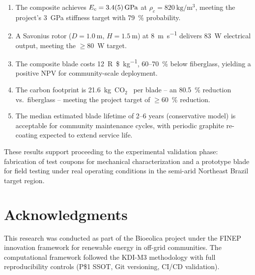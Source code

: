 \documentclass[twocolumn]{article}
\newcommand{\BrazilianReal}{R\$}
\newcommand{\COtwo}{\ensuremath{\mathrm{CO_2}}\xspace}
\newcommand{\COtwoe}{\COtwo\mathrm{e}\xspace}
\begin{document}
\begin{enumerate}
    \item The composite achieves $E_c = \SI{3.4 \pm 0.5}{\giga\pascal}$ at $\rho_c = \SI{820}{\kilogram\per\cubic\meter}$, meeting the project's \SI{3}{\giga\pascal} stiffness target with 79~\% probability.
    \item A Savonius rotor ($D = \SI{1.0}{\meter}$, $H = \SI{1.5}{\meter}$) at \SI{8}{\meter\per\second} delivers \SI{83}{\watt} electrical output, meeting the $\ge$\SI{80}{\watt} target.
    \item The composite blade costs \SI{12}{\BrazilianReal\per\kilogram}, 60--70~\% below fiberglass, yielding a positive NPV for community-scale deployment.
    \item The carbon footprint is \SI{21.6}{\kilogram\COtwoe} per blade -- an 80.5~\% reduction vs.\ fiberglass -- meeting the project target of $\ge$60~\% reduction.
    \item The median estimated blade lifetime of 2--6 years (conservative model) is acceptable for community maintenance cycles, with periodic graphite re-coating expected to extend service life.
\end{enumerate}

These results support proceeding to the experimental validation phase: fabrication of test coupons for mechanical characterization and a prototype blade for field testing under real operating conditions in the semi-arid Northeast Brazil target region.

\section*{Acknowledgments}
This research was conducted as part of the Bioeolica project under the FINEP innovation framework for renewable energy in off-grid communities. The computational framework followed the KDI-M3 methodology with full reproducibility controls (P\$1 SSOT, Git versioning, CI/CD validation).
\end{document}
